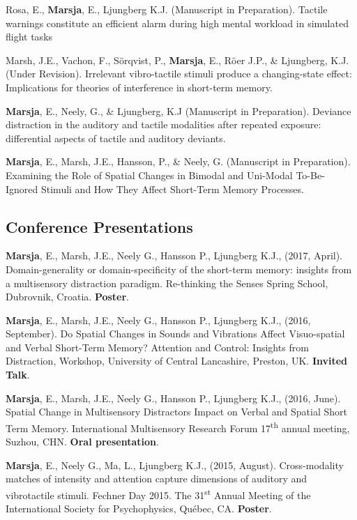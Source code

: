 \documentclass[]{article}
\begin{document}
Rosa, E., \textbf{Marsja}, E., Ljungberg K.J. (Manuscript in
Preparation). Tactile warnings constitute an efficient alarm during high
mental workload in simulated flight tasks

Marsh, J.E., Vachon, F., Sörqvist, P., \textbf{Marsja}, E., Röer J.P.,
\& Ljungberg, K.J. (Under Revision). Irrelevant vibro-tactile stimuli
produce a changing-state effect: Implications for theories of
interference in short-term memory.

\textbf{Marsja}, E., Neely, G., \& Ljungberg, K.J (Manuscript in
Preparation). Deviance distraction in the auditory and tactile
modalities after repeated exposure: differential aspects of tactile and
auditory deviants.

\textbf{Marsja}, E., Marsh, J.E., Hansson, P., \& Neely, G. (Manuscript
in Preparation). Examining the Role of Spatial Changes in Bimodal and
Uni-Modal To-Be-Ignored Stimuli and How They Affect Short-Term Memory
Processes.

\subsection{Conference Presentations}\label{conference-presentations}

\textbf{Marsja}, E., Marsh, J.E., Neely G., Hansson P., Ljungberg K.J.,
(2017, April). Domain-generality or domain-specificity of the short-term
memory: insights from a multisensory distraction paradigm. Re-thinking
the Senses Spring School, Dubrovnik, Croatia. \textbf{Poster}.

\textbf{Marsja}, E., Marsh, J.E., Neely G., Hansson P., Ljungberg K.J.,
(2016, September). Do Spatial Changes in Sounds and Vibrations Affect
Visuo-spatial and Verbal Short-Term Memory? Attention and Control:
Insights from Distraction, Workshop, University of Central Lancashire,
Preston, UK. \textbf{Invited Talk}.

\textbf{Marsja}, E., Marsh, J.E., Neely G., Hansson P., Ljungberg K.J.,
(2016, June). Spatial Change in Multisensory Distractors Impact on
Verbal and Spatial Short Term Memory. International Multisensory
Research Forum 17\textsuperscript{th} annual meeting, Suzhou, CHN.
\textbf{Oral presentation}.

\textbf{Marsja}, E., Neely G., Ma, L., Ljungberg K.J., (2015, August).
Cross-modality matches of intensity and attention capture dimensions of
auditory and vibrotactile stimuli. Fechner Day 2015. The
31\textsuperscript{st} Annual Meeting of the International Society for
Psychophysics, Québec, CA. \textbf{Poster}.
\end{document}
